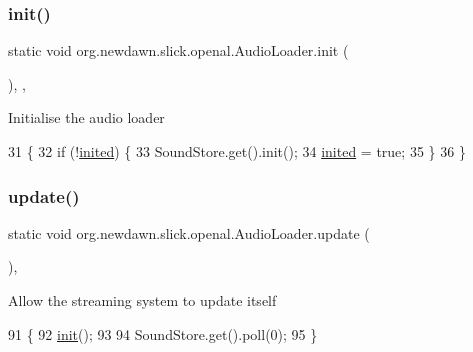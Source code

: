 \subsubsection{\texorpdfstring{init()}{init()}}
{\footnotesize\ttfamily static void org.\+newdawn.\+slick.\+openal.\+Audio\+Loader.\+init (\begin{DoxyParamCaption}{ }\end{DoxyParamCaption})\hspace{0.3cm}{\ttfamily [inline]}, {\ttfamily [static]}, {\ttfamily [private]}}

Initialise the audio loader 
\begin{DoxyCode}
31                                \{
32         \textcolor{keywordflow}{if} (!\mbox{\hyperlink{classorg_1_1newdawn_1_1slick_1_1openal_1_1_audio_loader_a9c9bf94e8f3380290bb6abd89c82d66c}{inited}}) \{
33             SoundStore.get().init();
34             \mbox{\hyperlink{classorg_1_1newdawn_1_1slick_1_1openal_1_1_audio_loader_a9c9bf94e8f3380290bb6abd89c82d66c}{inited}} = \textcolor{keyword}{true};
35         \}
36     \}
\end{DoxyCode}
\mbox{\label{classorg_1_1newdawn_1_1slick_1_1openal_1_1_audio_loader_ad0f82b81a9441b1b2bd432ec648dfed1}} 
\subsubsection{\texorpdfstring{update()}{update()}}
{\footnotesize\ttfamily static void org.\+newdawn.\+slick.\+openal.\+Audio\+Loader.\+update (\begin{DoxyParamCaption}{ }\end{DoxyParamCaption})\hspace{0.3cm}{\ttfamily [inline]}, {\ttfamily [static]}}

Allow the streaming system to update itself 
\begin{DoxyCode}
91                                 \{
92         \mbox{\hyperlink{classorg_1_1newdawn_1_1slick_1_1openal_1_1_audio_loader_ad2d2f4bb59fef206981fbe0896ecc87c}{init}}();
93         
94         SoundStore.get().poll(0);
95     \}
\end{DoxyCode}


